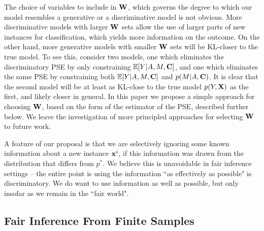 \documentclass[letterpaper]{article} %
\begin{document}
The choice of variables to include in ${\bf W}$, which governs the degree to which our model resembles a generative or a discriminative model is not obvious.  More discriminative models with larger ${\bf W}$ sets allow the use of larger parts of new instances for classification, which yields more information on the outcome.  On the other hand, more generative models with smaller ${\bf W}$ sets will be KL-closer to the true model.  To see this, consider two models, one which eliminates the discriminatory PSE by only constraining
$\mathbb{E}[Y | A,M,{\bf C}]$, and one which  eliminates the same PSE by constraining both $\mathbb{E}[Y | A,M,{\bf C}]$ and $p(M | A,{\bf C})$.  It is clear that the second model will be at least as KL-close to the true model $p(Y,{\bf X})$ as the first, and likely closer in general.  In this paper we propose a simple approach for choosing ${\bf W}$, based on the form of the estimator of the PSE, described further below.  We leave the investigation of more principled approaches for selecting ${\bf W}$ to future work.


A feature of our proposal is that we are selectively ignoring some known information about a new instance ${\bf x}^i$, if this information was drawn from the distribution that differs from $p^*$.  We believe this is unavoidable in fair inference settings -- the entire point is using the information ``as effectively as possible" is discriminatory.  We do want to use information as well as possible, but only insofar as we remain in the ``fair world".

\subsection{Fair Inference From Finite Samples}
\label{subsec:general}
\end{document}
